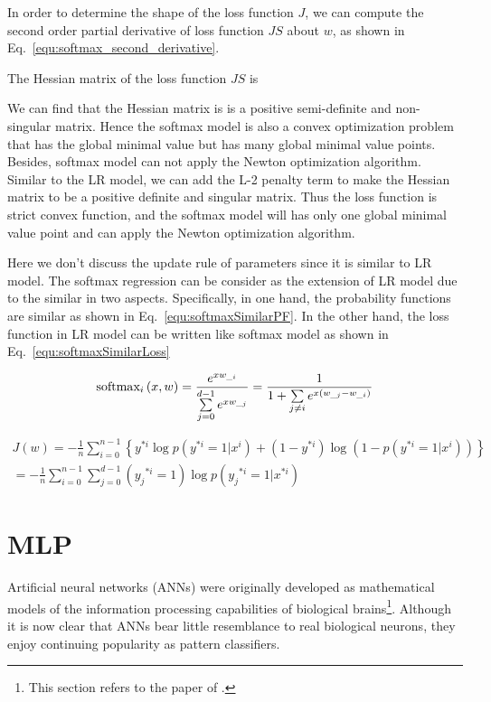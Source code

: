 \documentclass[runningheads,openany]{xhlPaper}
\begin{document}
In order to determine the shape of the loss function $J$, we can compute the second order partial derivative of loss function $JS$ about $w$, as shown in Eq.~\ref{equ:softmax_second_derivative}. 

The Hessian matrix of the loss function $JS$ is 

We can find that the Hessian matrix is is a positive semi-definite and non-singular matrix. Hence the softmax model is also a convex optimization problem that has the global minimal value but has many global minimal value points.
Besides, softmax model can not apply the Newton optimization algorithm.
Similar to the LR model, we can add the L-2 penalty term to make the Hessian matrix to be a positive definite and singular matrix. Thus the loss function is strict convex function, and the softmax model will has only one global minimal value point and can apply the Newton optimization algorithm.

Here we don't discuss the update rule of parameters since it is similar to LR model. The softmax regression can be consider as the extension of LR model due to the similar in two aspects. Specifically, in one hand, the probability functions are similar as shown in Eq.~\ref{equ:softmaxSimilarPF}. In the other hand, the loss function in LR model can be written like softmax model as shown in Eq.~\ref{equ:softmaxSimilarLoss}

\begin{equation}
\label{equ:softmaxSimilarPF}
{\rm{softma}}{{\rm{x}}_i}\left( {x,w} \right) = \frac{{{e^{x{w_{\_i}}}}}}{{\sum\limits_{j = 0}^{d - 1} {{e^{x{w_{\_j}}}}} }} = \frac{1}{{1 + \sum\limits_{j \ne i} {{e^{x\left( {{w_{\_j}} - {w_{\_i}}} \right)}}} }}
\end{equation}

\begin{equation}
\label{equ:softmaxSimilarLoss}
\begin{aligned}
J\left( w \right) =  - \frac{1}{n}\sum\limits_{i = 0}^{n - 1} {\left\{ {{y^{*i}}\log p\left( {{y^{*i}} = 1|{x^i}} \right) + \left( {1 - {y^{*i}}} \right)\log \left( {1 - p\left( {{y^{*i}} = 1|{x^i}} \right)} \right)} \right\}} \\
 =  - \frac{1}{n}\sum\limits_{i = 0}^{n - 1} {\sum\limits_{j = 0}^{d - 1} {\left( {{y_j}^{*i} = 1} \right)} \log p\left( {{y_j}^{*i} = 1|{x^{*i}}} \right)} 
\end{aligned}
\end{equation}

\section{MLP}
\label{sec:mlp}
Artificial neural networks (ANNs) were originally developed as mathematical models of the information processing capabilities of biological brains\footnote{This section refers to the paper of \cite{Graves_RNN_2012}.}.
Although it is now clear that ANNs bear little resemblance to real biological neurons, they enjoy continuing popularity as pattern classifiers.
\end{document}
